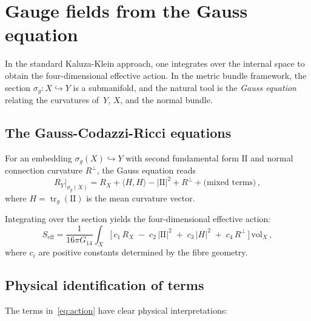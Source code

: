 \documentclass[12pt,a4paper]{article}
\theoremstyle{definition}
\newcommand{\tr}{\operatorname{tr}}
\begin{document}
\section{Gauge fields from the Gauss equation}
\label{sec:gauss}

In the standard Kaluza-Klein approach, one integrates over the internal space to obtain the four-dimensional effective action.
In the metric bundle framework, the section $\sigma_g\colon X \hookrightarrow Y$ is a submanifold, and the natural tool is the \emph{Gauss equation} relating the curvatures of~$Y$, $X$, and the normal bundle.

\subsection{The Gauss-Codazzi-Ricci equations}

For an embedding $\sigma_g(X) \hookrightarrow Y$ with second fundamental form $\mathrm{I\!I}$ and normal connection curvature $R^\perp$, the Gauss equation reads
\begin{equation}
\label{eq:gauss}
R_Y\big|_{\sigma_g(X)} = R_X + \langle H, H \rangle - |\mathrm{I\!I}|^2 + R^\perp + \text{(mixed terms)}\,,
\end{equation}
where $H = \tr_g(\mathrm{I\!I})$ is the mean curvature vector.

Integrating over the section yields the four-dimensional effective action:
\begin{equation}
\label{eq:action}
S_{\text{eff}} = \frac{1}{16\pi G_{14}} \int_X \Big[\, c_1\, R_X \;-\; c_2\, |\mathrm{I\!I}|^2 \;+\; c_3\, |H|^2 \;+\; c_4\, R^\perp \,\Big]\, \mathrm{vol}_X\,,
\end{equation}
where $c_i$ are positive constants determined by the fibre geometry.

\subsection{Physical identification of terms}

The terms in~\eqref{eq:action} have clear physical interpretations:
\end{document}
